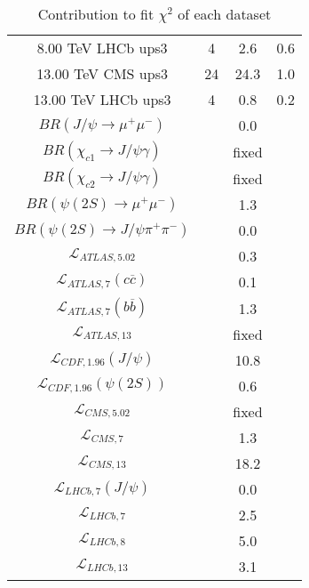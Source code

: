 \begin{table}[h!]
\begin{tabular}{c|c|c|c}
8.00 TeV LHCb ups3 & 4 & 2.6 & 0.6 \\
13.00 TeV CMS ups3 & 24 & 24.3 & 1.0 \\
13.00 TeV LHCb ups3 & 4 & 0.8 & 0.2 \\
\hline
$BR(J/\psi\rightarrow\mu^+\mu^-)$ &  & 0.0 &  \\
$BR(\chi_{c1}\rightarrow J/\psi\gamma)$ &  & fixed & \\
$BR(\chi_{c2}\rightarrow J/\psi\gamma)$ &  & fixed & \\
$BR(\psi(2S)\rightarrow\mu^+\mu^-)$ &  & 1.3 &  \\
$BR(\psi(2S)\rightarrow J/\psi\pi^+\pi^-)$ &  & 0.0 &  \\
$\mathcal L_{ATLAS,5.02}$ &  & 0.3 &  \\
$\mathcal L_{ATLAS,7}(c\overline c)$ &  & 0.1 &  \\
$\mathcal L_{ATLAS,7}(b\overline b)$ &  & 1.3 &  \\
$\mathcal L_{ATLAS,13}$ &  & fixed & \\
$\mathcal L_{CDF,1.96}(J/\psi)$ &  & 10.8 &  \\
$\mathcal L_{CDF,1.96}(\psi(2S))$ &  & 0.6 &  \\
$\mathcal L_{CMS,5.02}$ &  & fixed & \\
$\mathcal L_{CMS,7}$ &  & 1.3 &  \\
$\mathcal L_{CMS,13}$ &  & 18.2 &  \\
$\mathcal L_{LHCb,7}(J/\psi)$ &  & 0.0 &  \\
$\mathcal L_{LHCb,7}$ &  & 2.5 &  \\
$\mathcal L_{LHCb,8}$ &  & 5.0 &  \\
$\mathcal L_{LHCb,13}$ &  & 3.1 &  \\
\end{tabular}
\caption{Contribution to fit $\chi^2$ of each dataset}
\end{table}
